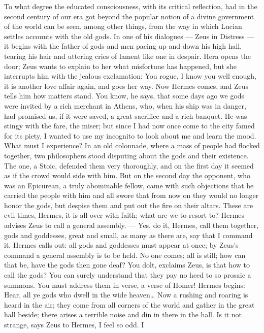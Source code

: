 \documentclass[12pt,a4paper,openany]{book}
\newcommand{\opage}[1]{\marginnote{\footnotesize\textit{[#1]}}}
\begin{document}
To what degree the educated consciousness, with its critical reflection, had in the second
century of our era got beyond the popular notion of a divine government of the world can be
seen, among other things, from the way in which Lucian settles accounts with the old gods. In
one of his dialogues
--- Zeus in Distress --- it begins with the father of gods and men pacing up and down his high
hall, tearing his hair and uttering cries of lament like one in despair. Hera opens the door;
Zeus wants to explain to her what misfortune has happened, but she interrupts him with the
jealous exclamation: You rogue, I know you well enough, it is another love affair again, and
goes her way. Now Hermes comes, and Zeus tells him how matters stand. You know, he says, that
some days ago we gods were invited by a rich merchant in Athens, who, when his ship was in
danger, had promised us, if it were saved, a great sacrifice and a rich banquet. He was stingy
with the fare, the miser; but since I had now once come to the city famed for its piety, I
wanted to use my incognito to look about me and learn the mood. What must I experience? In an
old colonnade, where a mass of people had flocked together, two philosophers stood disputing
about the gods and their existence. The one, a Stoic, defended them very thoroughly, and on the
first day it seemed as if the crowd would side with him. But
\setcounter{footnote}{0}%
\opage{45}on the second day the opponent, who was an Epicurean, a truly abominable fellow, came
with such objections that he carried the people with him and all swore that from now on they
would no longer honor the gods, but despise them and put out the fire on their altars. These
are evil times, Hermes, it is all over with faith; what are we to resort to? Hermes advises
Zeus to call a general assembly. --- Yes, do it, Hermes, call them together, gods and
goddesses, great and small, as many as there are, say that I command it. Hermes calls out: all
gods and goddesses must appear at once; by Zeus's command a general assembly is to be held. No
one comes; all is still; how can that be, have the gods then gone deaf? You dolt, exclaims
Zeus, is that how to call the gods? You can surely understand that they pay no heed to so
prosaic a summons. You must address them in verse, a verse of Homer! Hermes begins: Hear, all
ye gods who dwell in the wide heaven\dots{} Now a rushing and roaring is heard in the air; they
come from all corners of the world and gather in the great hall beside; there arises a terrible
noise and din in there in the hall. Is it not strange, says Zeus to Hermes, I feel so odd. I
\end{document}
